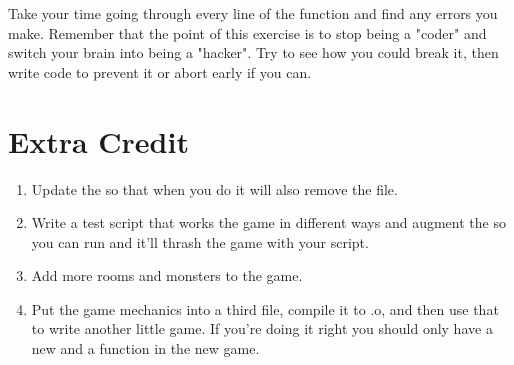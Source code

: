 Take your time going through every line of the function and find any errors you
make.  Remember that the point of this exercise is to stop being a "coder" and
switch your brain into being a "hacker".  Try to see how you could break it,
then write code to prevent it or abort early if you can.

\section{Extra Credit}

\begin{enumerate}
\item Update the  so that when you do  
     it will also remove the  file.
\item Write a test script that works the game in different ways and augment
    the  so you can run  and it'll thrash
    the game with your script.
\item Add more rooms and monsters to the game.
\item Put the game mechanics into a third file, compile it to .o, and then
    use that to write another little game.  If you're doing it right
    you should only have a new  and a  function
    in the new game.
\end{enumerate}

